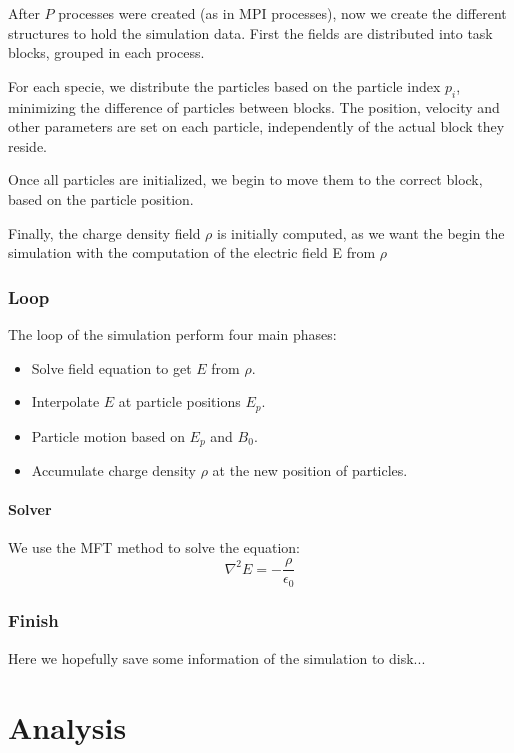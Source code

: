 \documentclass[a4paper]{report}
\begin{document}
After $P$ processes were created (as in MPI processes), now we create the 
different structures to hold the simulation data. First the fields are 
distributed into task blocks, grouped in each process.

For each specie, we distribute the particles based on the particle index $p_i$, 
minimizing the difference of particles between blocks. The position, velocity 
and other parameters are set on each particle, independently of the actual block 
they reside.

Once all particles are initialized, we begin to move them to the correct block, 
based on the particle position.

Finally, the charge density field $\rho$ is initially computed, as we want the 
begin the simulation with the computation of the electric field E from $\rho$

\subsection{Loop}

The loop of the simulation perform four main phases:

\begin{itemize}
\item Solve field equation to get $E$ from $\rho$.
\item Interpolate $E$ at particle positions $E_p$.
\item Particle motion based on $E_p$ and $B_0$.
\item Accumulate charge density $\rho$ at the new position of particles.
\end{itemize}

\subsubsection{Solver}

We use the MFT method to solve the equation:
\begin{equation}
\nabla^2 E = - \frac{\rho}{\epsilon_0}
\end{equation}

\subsection{Finish}

Here we hopefully save some information of the simulation to disk...


\chapter{Analysis}
\end{document}
